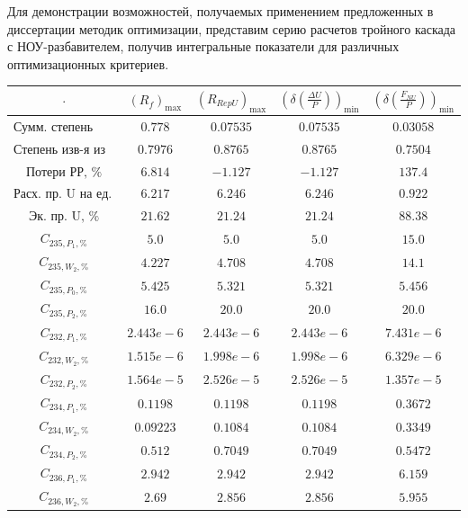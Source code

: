 Для демонстрации возможностей, получаемых применением предложенных в диссертации методик оптимизации, представим серию расчетов тройного каскада с НОУ-разбавителем, получив интегральные показатели для различных оптимизационных критериев.


\begin{table}
    \begin{tabular}{ccccc}
        $\cdot$ & $(R_f)_\text{max}$ & $(R_{RepU})_\text{max}$ & $(\delta(\frac{\Delta U}{P}))_\text{min}$ & $(\delta(\frac{F_{NU}}{P}))_\text{min}$\\ \hline
        $\text{Сумм. степень изв-я}$ & $0.778$ & $0.07535$ & $0.07535$ & $0.03058$\\ \hline
        $\text{Степень изв-я из рег-та}$ & $0.7976$ & $0.8765$ & $0.8765$ & $0.7504$\\ \hline
        $\text{Потери РР, \%}$ & $6.814$ & $-1.127$ & $-1.127$ & $137.4$\\ \hline
        $\text{Расх. пр. U на ед. прод.}$ & $6.217$ & $6.246$ & $6.246$ & $0.922$\\ \hline
        $\text{Эк. пр. U, \%}$ & $21.62$ & $21.24$ & $21.24$ & $88.38$\\ \hline
        $C_{235,P_1, \%}$ & $5.0$ & $5.0$ & $5.0$ & $15.0$\\ \hline
        $C_{235,W_2, \%}$ & $4.227$ & $4.708$ & $4.708$ & $14.1$\\ \hline
        $C_{235,P_0, \%}$ & $5.425$ & $5.321$ & $5.321$ & $5.456$\\ \hline
        $C_{235,P_2, \%}$ & $16.0$ & $20.0$ & $20.0$ & $20.0$\\ \hline
        $C_{232,P_1, \%}$ & $2.443e-6$ & $2.443e-6$ & $2.443e-6$ & $7.431e-6$\\ \hline
        $C_{232,W_2, \%}$ & $1.515e-6$ & $1.998e-6$ & $1.998e-6$ & $6.329e-6$\\ \hline
        $C_{232,P_2, \%}$ & $1.564e-5$ & $2.526e-5$ & $2.526e-5$ & $1.357e-5$\\ \hline
        $C_{234,P_1, \%}$ & $0.1198$ & $0.1198$ & $0.1198$ & $0.3672$\\ \hline
        $C_{234,W_2, \%}$ & $0.09223$ & $0.1084$ & $0.1084$ & $0.3349$\\ \hline
        $C_{234,P_2, \%}$ & $0.512$ & $0.7049$ & $0.7049$ & $0.5472$\\ \hline
        $C_{236,P_1, \%}$ & $2.942$ & $2.942$ & $2.942$ & $6.159$\\ \hline
        $C_{236,W_2, \%}$ & $2.69$ & $2.856$ & $2.856$ & $5.955$\\ \hline

\end{tabular}
\end{table}
